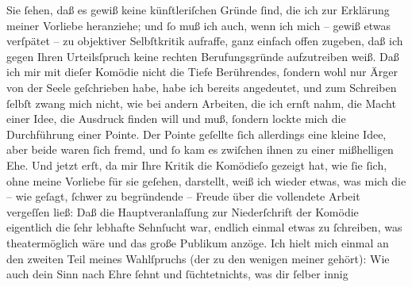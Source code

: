 \begin{ledgroupsized}[t]{13cm}
           Sie ſehen, daß es gewiß keine künſtleriſchen Gründe ſind, die ich zur Erklärung
               meiner Vorliebe heranziehe; und ſo muß ich auch, wenn {\pb}ich mich – gewiß etwas verſpätet – zu objektiver Selbſtkritik aufraffe, ganz
               einfach offen zugeben, daß ich gegen Ihren Urteilsſpruch keine rechten
               Berufungsgründe aufzutreiben weiß. Daß ich mir mit dieſer Komödie nicht die Tiefe
               Berührendes, ſondern wohl nur Ärger von der Seele geſchrieben habe, habe ich bereits
               angedeutet, und zum Schreiben ſelbſt zwang mich nicht, wie bei andern Arbeiten, die
               ich ernſt nahm, die Macht einer Idee, die Ausdruck finden will und muß, ſondern
               lockte mich die Durchführung einer Pointe. Der Pointe geſellte ſich allerdings eine
               kleine Idee, aber beide waren ſich fremd, und ſo kam es zwiſchen ihnen zu einer
               mißhelligen Ehe.\pend
           \pstart
           Und jetzt erſt, da mir Ihre Kritik die Komödieſo gezeigt hat, wie ſie ſich, ohne meine Vorliebe
               für sie geſehen, darstellt, weiß ich wieder etwas,
               was mich die – wie geſagt, ſchwer zu begründende – Freude über die vollendete Arbeit
               vergeſſen ließ: Daß die Hauptveranlaſſung zur Niederſchrift der Komödie eigentlich
               die ſehr lebhafte Sehnſucht war, endlich einmal etwas zu ſchreiben, was
               theatermöglich wäre und das große Publikum anzöge. Ich hielt mich einmal an den
               zweiten Teil meines Wahlſpruchs (der zu den wenigen meiner \label{K_L02215_1v}\label{K_L02215_1h} gehört):\pend
           \stanza{}{\pb}Wie auch dein Sinn nach Ehre
                     ſehnt und ſüchtet\newverse{}nichts, was dir ſelber innig

\end{ledgroupsized}
